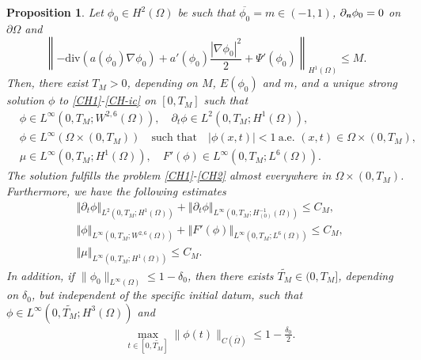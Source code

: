 \documentclass[11pt,reqno]{amsart}
\newtheorem{proposition}[theorem]{Proposition}
\theoremstyle{remark}
\newcommand \norm[1] {\left\Vert #1\right\Vert}
\def\n{\textbf{\textit{n}}}
\def\div{\mathrm{div}}
\numberwithin{equation}{section}
\begin{document}
\begin{proposition}\label{CHstrong-solution}
Let $\phi_0\in H^2(\Omega)$ be such that $\overline{\phi_0}=m \in (-1,1) $,  $\partial_\n \phi_0=0$ on $\partial \Omega$ and
\begin{equation}
\label{mu0}
\left\| -\div \left( a(\phi_0) \nabla \phi_0 \right) + a'(\phi_0) \frac{|\nabla \phi_0|^2}{2} + \Psi'(\phi_0) \right\|_{H^1(\Omega)}\leq M.
\end{equation}
Then, there exist $T_M>0$, depending on $M$, $E(\phi_0)$ and $m$, and a unique strong solution $\phi$ to \eqref{CH1}-\eqref{CH-ic} on $[0,T_M]$ such that 
\begin{equation}
\label{SS-phi}
\begin{split}
&\phi \in L^\infty(0,T_M; W^{2,6}(\Omega)), \quad
\partial_t \phi \in L^2(0 ,T_M;H^1(\Omega)),\\
&\phi \in L^{\infty}(\Omega\times (0,T_M)) \quad\text{such that}\quad |\phi(x,t)|<1
\ \text{a.e. }(x,t)\in \Omega\times (0,T_M),\\
&\mu \in L^\infty(0,T_M; H^1(\Omega)),
\quad F'(\phi) \in L^\infty(0,T_M; L^6(\Omega)).
\end{split}
\end{equation}
The solution fulfills the problem \eqref{CH1}-\eqref{CH2} almost everywhere in $\Omega \times (0, T_M)$.
Furthermore, we have the following estimates
\begin{align}
\label{strong est 1}
&\norm{\partial_t \phi}_{L^2(0,T_M; H^1(\Omega))}
+ \norm{\partial_t \phi}_{L^{\infty}(0, T_M; H^{-1}_{(0)}(\Omega))}
\le C_M,
\\
\label{strong est 3}
&\norm{\phi}_{L^{\infty}(0,T_M; W^{2,6}(\Omega))} +
\norm{F'(\phi)}_{L^{\infty}(0, T_M; L^6(\Omega))}
\le C_M,
\\
\label{strong est 2}
& \norm{\mu}_{L^{\infty}(0,T_M; H^1(\Omega))}
\le C_M.
\end{align}
In addition, if $\| \phi_0\|_{L^\infty(\Omega)}\leq 1- \delta_0$, then there exists $\widetilde{T_M}\in (0,T_M]$, depending on $\delta_0$, but independent of the specific initial datum, such that
$\phi \in L^\infty(0,\widetilde{T_M}; H^3(\Omega))$ and
\begin{align}
\label{strong est 4}
&\max_{t \in [0,\widetilde{T_M} ]} \| \phi (t)\|_{C(\overline{\Omega})} \leq 1-\frac{\delta_0}{2}.
\end{align}
\end{proposition}
\end{document}
